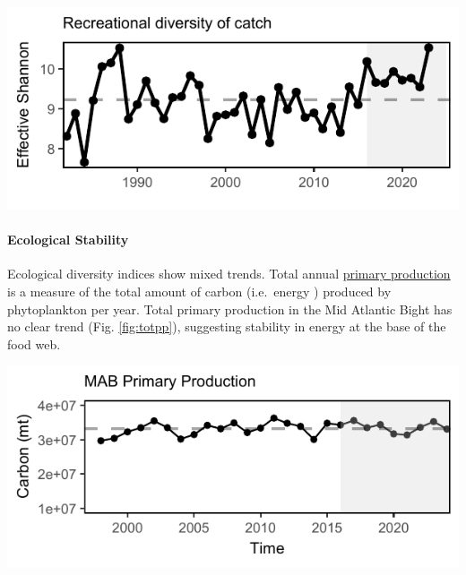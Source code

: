 \documentclass[
  10pt,
]{article}
\let\origfigure\figure
\let\endorigfigure\endfigure
\renewenvironment{figure}[1][2] {
    \expandafter\origfigure\expandafter[H]
} {
    \endorigfigure
}
\begin{document}
\begin{figure}

{\centering \includegraphics{midatlantic_files/figure-latex/recdat-div-catch-1} 

}

\caption{Diversity of recreational catch in the Mid Atlantic.}\label{fig:recdat-div-catch}
\end{figure}

\paragraph{Ecological Stability}\label{ecological-stability}

Ecological diversity indices show mixed trends. Total annual \href{https://noaa-edab.github.io/catalog/chl_pp.html}{primary production} is a measure of the total amount of carbon (i.e.~energy ) produced by phytoplankton per year. Total primary production in the Mid Atlantic Bight has no clear trend (Fig. \ref{fig:totpp}), suggesting stability in energy at the base of the food web.

\begin{figure}

{\centering \includegraphics{midatlantic_files/figure-latex/totpp-1} 

}

\caption{Total areal annual primary production for the MAB. The dashed line represents the long-term (1998-2024) annual mean.}\label{fig:totpp}
\end{figure}
\end{document}
